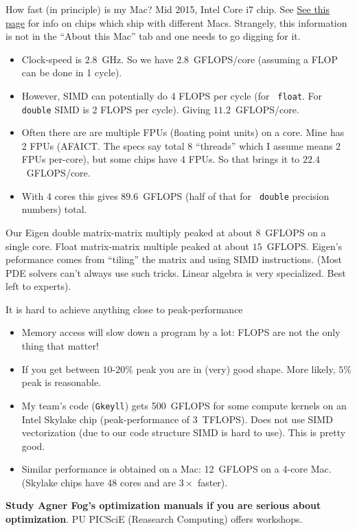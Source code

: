 \documentclass[aspectratio=169]{beamer}
\newcommand{\mypause}{\pause}
\begin{document}
\begin{frame}{How fast (in principle) is my Mac?}
  \footnotesize%
  Mid 2015, Intel Core i7 chip.  See
  \href{https://everymac.com/systems/apple/macbook_pro/specs/macbook-pro-core-i7-2.8-15-iris-only-mid-2015-retina-display-specs.html}{See
    this page} for info on chips which ship with different
  Macs. Strangely, this information is not in the ``About this Mac''
  tab and one needs to go digging for it.
  \begin{itemize}
  \item Clock-speed is $2.8$~GHz. So we have $2.8$~GFLOPS/core
    (assuming a FLOP can be done in 1 cycle).%
    \mypause%
  \item However, SIMD can potentially do 4 FLOPS per cycle (for {\tt
      float}. For {\tt double} SIMD is 2 FLOPS per cycle). Giving
    $11.2$~GFLOPS/core.%
    \mypause%
  \item Often there are are multiple FPUs (floating point units) on a
    core. Mine has 2 FPUs (AFAICT. The specs say total 8 ``threads''
    which I assume means 2 FPUs per-core), but some chips have 4
    FPUs. So that brings it to $22.4$~GFLOPS/core.
  \item With 4 cores this gives $89.6$~GFLOPS (half of that for {\tt
      double} precision numbers) total.
  \end{itemize}
  Our Eigen double matrix-matrix multiply peaked at about $8$~GFLOPS
  on a single core. Float matrix-matrix multiple peaked at about
  $15$~GFLOPS.%
  \mypause%
  \vskip0.1in%
  Eigen's peformance comes from ``tiling'' the matrix and using SIMD
  instructions. (Most PDE solvers can't always use such tricks. Linear
  algebra is very specialized. Best left to experts). 
\end{frame}

\begin{frame}{It is hard to achieve anything close to
    peak-performance}
  \begin{itemize}
  \item Memory access will slow down a program by a lot: FLOPS are not
    the only thing that matter!
  \item If you get between $10$-$20\%$ peak you are in (very) good
    shape. More likely, $5\%$ peak is reasonable.
  \item My team's code ({\tt Gkeyll}) gets 500~GFLOPS for some compute
    kernels on an Intel Skylake chip (peak-performance of
    3~TFLOPS). Does not use SIMD vectorization (due to our code
    structure SIMD is hard to use). This is pretty good.
  \item Similar performance is obtained on a Mac: 12~GFLOPS on a
    4-core Mac. (Skylake chips have 48 cores and are $3\times$
    faster).
  \end{itemize}
  {\bf Study Agner Fog's optimization manuals if you are serious about
    optimization}. PU PICSciE (Reasearch Computing) offers workshops.
\end{frame}
\end{document}
